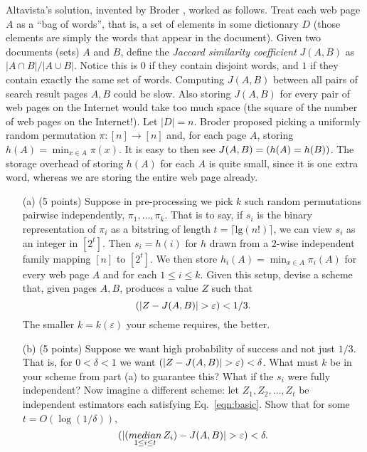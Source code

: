 \documentclass[12pt]{article}
\newcommand{\eps}{\varepsilon}
\let\Pr\relax
\DeclareMathOperator*{\Pr}{\mathbb{P}}
\begin{document}
Altavista's solution, invented by Broder \cite{Broder97}, worked as follows. Treat each web page $A$ as a ``bag of words'', that is, a set of elements in some dictionary $D$ (those elements are simply the words that appear in the document). Given two documents (sets) $A$ and $B$, define the {\em Jaccard similarity coefficient} $J(A,B)$ as $|A\cap B|/|A\cup B|$. Notice this is $0$ if they contain disjoint words, and $1$ if they contain exactly the same set of words. Computing $J(A,B)$ between all pairs of search result pages $A,B$ could be slow. Also storing $J(A,B)$ for every pair of web pages on the Internet would take too much space (the square of the number of web pages on the Internet!). Let $|D| = n$. Broder proposed picking a uniformly random permutation $\pi:[n]\rightarrow[n]$ and, for each page $A$, storing $h(A) = \min_{x\in A} \pi(x)$. It is easy to then see $J(A,B) = \Pr(h(A) = h(B))$. The storage overhead of storing $h(A)$ for each $A$ is quite small, since it is one extra word, whereas we are storing the entire web page already.

\begin{itemize}
\item[(a)] (5 points) Suppose in pre-processing we pick $k$ such random permutations pairwise independently, $\pi_1,\ldots,\pi_k$. That is to say, if $s_i$ is the binary representation of $\pi_i$ as a bitstring of length $t = \lceil\mathrm{lg} (n!)\rceil$, we can view $s_i$ as an integer in $[2^t]$. Then $s_i = h(i)$ for $h$ drawn from a $2$-wise independent family mapping $[n]$ to $[2^t]$. We then store $h_i(A) = \min_{x\in A}\pi_i(A)$ for every web page $A$ and for each $1\le i\le k$. Given this setup, devise a scheme that, given pages $A, B$, produces a value $Z$ such that
\begin{equation}
\Pr(|Z - J(A,B)| > \eps) < 1/3 . \label{eqn:basic}
\end{equation}
The smaller $k = k(\eps)$ your scheme requires, the better.
\item[(b)] (5 points) Suppose we want high probability of success and not just $1/3$. That is, for $0<\delta<1$ we want $ \Pr(|Z - J(A,B)| > \eps) < \delta$. What must $k$ be in your scheme from part (a) to guarantee this? What if the $s_i$ were fully independent? Now imagine a different scheme: let $Z_1,Z_2,\ldots,Z_t$ be independent estimators each satisfying Eq.\ \eqref{eqn:basic}. Show that for some $t = O(\log(1/\delta))$,
$$
\Pr(|(\mathop{median}_{1\le i\le t} Z_i) - J(A,B)| > \eps) < \delta .
$$
\end{itemize}
\end{document}

